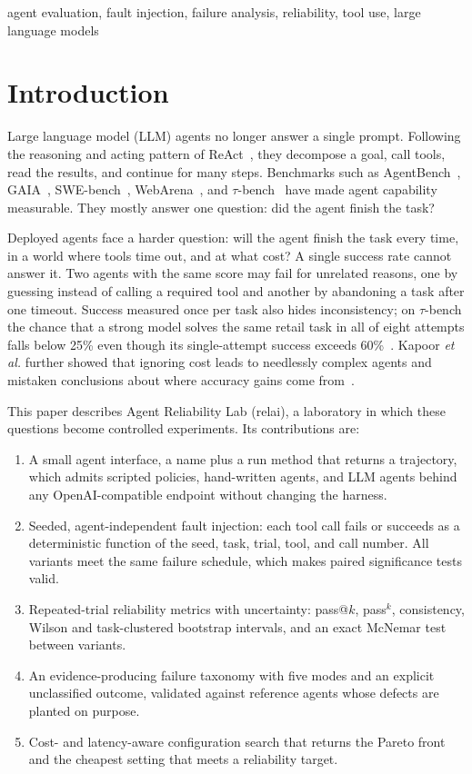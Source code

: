 \documentclass[conference,a4paper]{IEEEtran}
\begin{document}
\begin{IEEEkeywords}
agent evaluation, fault injection, failure analysis, reliability, tool use, large language models
\end{IEEEkeywords}

\section{Introduction}

Large language model (LLM) agents no longer answer a single prompt. Following the
reasoning and acting pattern of ReAct~\cite{yao2023react}, they decompose a goal, call
tools, read the results, and continue for many steps. Benchmarks such as
AgentBench~\cite{liu2024agentbench}, GAIA~\cite{mialon2024gaia},
SWE-bench~\cite{jimenez2024swebench}, WebArena~\cite{zhou2024webarena}, and
$\tau$-bench~\cite{yao2024taubench} have made agent capability measurable. They mostly
answer one question: did the agent finish the task?

Deployed agents face a harder question: will the agent finish the task every time, in a
world where tools time out, and at what cost? A single success rate cannot answer it.
Two agents with the same score may fail for unrelated reasons, one by guessing instead
of calling a required tool and another by abandoning a task after one timeout. Success
measured once per task also hides inconsistency; on $\tau$-bench the chance that a
strong model solves the same retail task in all of eight attempts falls below 25\% even
though its single-attempt success exceeds 60\%~\cite{yao2024taubench}. Kapoor
\textit{et al.} further showed that ignoring cost leads to needlessly complex agents and
mistaken conclusions about where accuracy gains come from~\cite{kapoor2024agents}.

This paper describes Agent Reliability Lab (relai), a laboratory in which these
questions become controlled experiments. Its contributions are:

\begin{enumerate}
\item A small agent interface, a name plus a run method that returns a trajectory, which
admits scripted policies, hand-written agents, and LLM agents behind any
OpenAI-compatible endpoint without changing the harness.
\item Seeded, agent-independent fault injection: each tool call fails or succeeds as a
deterministic function of the seed, task, trial, tool, and call number. All variants
meet the same failure schedule, which makes paired significance tests valid.
\item Repeated-trial reliability metrics with uncertainty: pass@$k$, pass$^k$,
consistency, Wilson and task-clustered bootstrap intervals, and an exact McNemar test
between variants.
\item An evidence-producing failure taxonomy with five modes and an explicit
unclassified outcome, validated against reference agents whose defects are planted on
purpose.
\item Cost- and latency-aware configuration search that returns the Pareto front and the
cheapest setting that meets a reliability target.
\end{enumerate}
\end{document}
